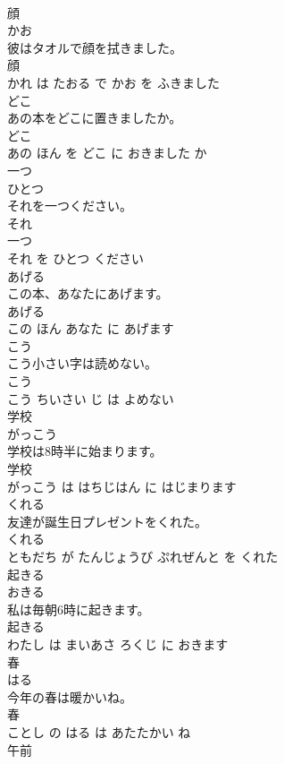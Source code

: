 \documentclass[8pt]{extreport}
\begin{document}
\begin{CJK}{UTF8}{min}
\\	顔	
\\	かお			
\\	彼はタオルで顔を拭きました。	
\\	顔 
\\	かれ は たおる で かお を ふきました			
\\	どこ	
\\	あの本をどこに置きましたか。	
\\	どこ 
\\	あの ほん を どこ に おきました か			
\\	一つ	
\\	ひとつ			
\\	それを一つください。	
\\	それ 
\\	一つ 
\\	それ を ひとつ ください			
\\	あげる	
\\	この本、あなたにあげます。	
\\	あげる 
\\	この ほん あなた に あげます			
\\	こう	
\\	こう小さい字は読めない。	
\\	こう 
\\	こう ちいさい じ は よめない			
\\	学校	
\\	がっこう			
\\	学校は8時半に始まります。	
\\	学校 
\\	がっこう は はちじはん に はじまります			
\\	くれる	
\\	友達が誕生日プレゼントをくれた。	
\\	くれる 
\\	ともだち が たんじょうび ぷれぜんと を くれた			
\\	起きる	
\\	おきる			
\\	私は毎朝6時に起きます。	
\\	起きる 
\\	わたし は まいあさ ろくじ に おきます			
\\	春	
\\	はる			
\\	今年の春は暖かいね。	
\\	春 
\\	ことし の はる は あたたかい ね			
\\	午前	

\end{CJK}
\end{document}
